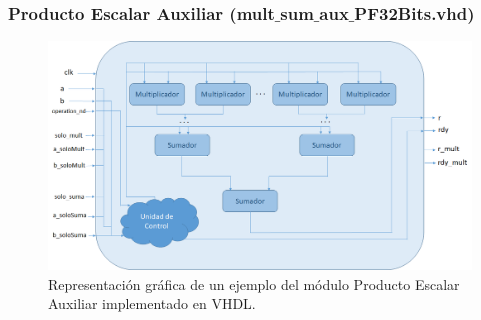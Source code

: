 \subsubsection{Producto Escalar Auxiliar (mult$\_$sum$\_$aux$\_$PF32Bits.vhd)}

\begin{figure}
  \centering
    \includegraphics[width=1\textwidth]{Imagenes/DiagramaModuloProductoEscalarAuxiliar.png}
  \caption{Representación gráfica de un ejemplo del módulo Producto Escalar Auxiliar implementado en VHDL.}
  \label{fig:modulo producto escalar auxiliar vhdl}
\end{figure}

